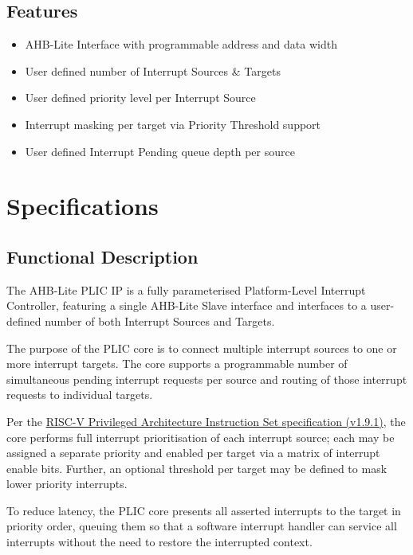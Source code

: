 \documentclass[]{article}
\begin{document}
\subsection{Features}

\begin{itemize}
\item
  AHB-Lite Interface with programmable address and data width
\item
  User defined number of Interrupt Sources \& Targets
\item
  User defined priority level per Interrupt Source
\item
  Interrupt masking per target via Priority Threshold support
\item
  User defined Interrupt Pending queue depth per source
\end{itemize}

\section{Specifications}

\subsection{Functional Description}

The AHB-Lite PLIC IP is a fully parameterised Platform-Level Interrupt
Controller, featuring a single AHB-Lite Slave interface and interfaces
to a user-defined number of both Interrupt Sources and Targets.

The purpose of the PLIC core is to connect multiple interrupt sources to
one or more interrupt targets. The core supports a programmable number
of simultaneous pending interrupt requests per source and routing of
those interrupt requests to individual targets.

Per the
\href{https://people.eecs.berkeley.edu/%7Ekrste/papers/riscv-privileged-v1.9.1.pdf}{RISC-V
Privileged Architecture Instruction Set specification (v1.9.1)}, the
core performs full interrupt prioritisation of each interrupt source;
each may be assigned a separate priority and enabled per target via a
matrix of interrupt enable bits. Further, an optional threshold per
target may be defined to mask lower priority interrupts.

To reduce latency, the PLIC core presents all asserted interrupts to the
target in priority order, queuing them so that a software interrupt
handler can service all interrupts without the need to restore the
interrupted context.
\end{document}
